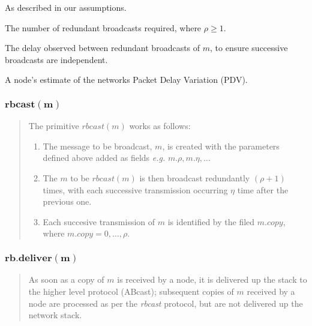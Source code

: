    \begin{description}[leftmargin=1cm, labelindent=1cm]
        \item[$\bm{x_{mx}}$ \textnormal{and}  $\bm{q}$ - ]    As described in our assumptions.
        
        \item[$\bm{\rho}$ - ]    The number of redundant broadcasts required, where $\rho \geq 1$.
        
        \item[$\bm{\eta}$ - ]    The delay observed between redundant broadcasts of $m$, to ensure successive broadcasts are independent.  
        
        \item[$\bm{\omega}$ - ]    A node's estimate of the networks Packet Delay Variation (PDV).  
        \end{description}
    
    \subsubsection*{$\bm{rbcast(m)}$}
    \begin{quotation}
    \noindent The primitive $rbcast(m)$ works as follows:
    \begin{enumerate}[label=\roman*]
        \item    The message to be broadcast, $m$, is created with the parameters defined above added as fields \emph{e.g.} $m.\rho, m.\eta, \ldots$ 
        
        \item    The $m$ to be $rbcast(m)$ is then broadcast redundantly $(\rho + 1)$ times, with each successive transmission occurring $\eta$ time after the previous one.  
        
        \item    Each succesive transmission of $m$ is identified by the filed $m.copy$, where $m.copy = 0, \ldots, \rho$.  
    \end{enumerate}
        \end{quotation}

    
     \subsubsection*{$\bm{rb.deliver(m)}$}
	     \begin{quotation}
	     As soon as a copy of $m$ is received by a node, it is delivered up the stack to the higher level protocol (\textsf{ABcast}); subsequent copies of $m$ received by a node are processed as per the \emph{rbcast} protocol, but are not delivered up the network stack.  
	     \end{quotation}
	         

